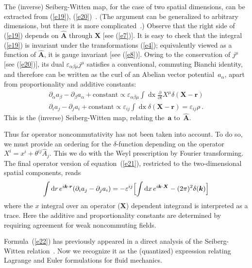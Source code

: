 \documentclass[a4paper,12pt,twoside]{article}
\newcommand{\rd}[1]{\mathop{\mathrm{d}#1}}
\newcommand{\va}{\vec a}
\newcommand{\vA}{\vec A}
\newcommand{\numeq}[2]{\begin{equation}
#2
\label{#1}
\end{equation}}
\newcommand{\refeq}[1]{(\ref{#1})}
\let\vec\boldsymbol
\let\eps\varepsilon
\let\hat\widehat
\begin{document}
The (inverse) Seiberg-Witten map, for the case of two spatial dimensions, can be extracted
from \refeq{e19}, \refeq{e20}~\cite{r3}.  (The argument can be generalized to arbitrary
dimensions, but there it is more complicated~\cite{r3}.) Observe that the right side of
\refeq{e19} depends on
$\hat {\vA}$ through
$\vec X$ [see
\refeq{e7}]. It is easy to check that the integral \refeq{e19} is invariant under the
transformations \refeq{e4}; equivalently viewed as a function of $\hat {\vA}$, it is gauge
invariant   [see \refeq{e8}]. Owing to the conservation of $j^\mu$   [see \refeq{e20}], its dual 
$\eps_{\alpha\beta\mu} j^\mu$ satisfies a conventional, commuting Bianchi identity, and
therefore can be written as the curl of an Abelian vector potential~$a_\alpha$, apart from
proportionality  and additive constants: 
\numeq{e21}{
\begin{gathered}
\partial_\alpha a_\beta - \partial _\beta a_\alpha + \text{constant} 
\propto \eps_{\alpha\beta\mu} \int \rd x \frac\partial{\partial t} X^\mu \delta(\vec X- \vec
r)\\
\partial_i a_j - \partial _j a_i + \text{constant} 
\propto \eps_{ij} \int \rd x   \delta(\vec X- \vec r) = \eps_{ij} \rho\ .
\end{gathered}
 }
This is the (inverse) Seiberg-Witten map, relating the~$\va$ to~$\hat {\vA}$. 

Thus far operator noncommutativity has not been taken into account. To do so, we must
provide an ordering for the $\delta$-function depending on the operator $X^i = x^i + \theta^{ij}
\hat A_j$.  This we do with the Weyl prescription by Fourier transforming. The  final operator
version of equation~\refeq{e21}, restricted to the two-dimensional spatial components, reads
\numeq{e22}{
\int \rd r e^{i\vec k\cdot\vec r} (\partial_i a_j - \partial_j a_i) = 
-\eps^{ij} \Bigl[ \int \rd x  e^{i\vec k\cdot\vec X} - (2\pi)^2\delta(\vec k)   \Bigr] 
}
where the $x$ integral over an operator ($\vec X$) dependent integrand is interpreted as a
trace.  Here the additive and proportionality constants are determined by requiring
agreement for weak noncommuting fields.

Formula~\refeq{e22} has previously appeared  in a direct analysis of the Seiberg-Witten
relation~\cite{r9}. Now we recognize it as the (quantized) expression relating Lagrange and
Euler formulations for fluid mechanics. 

 \newpage 
\def\Journal#1#2#3#4{{\em #1} {\bf #2}, #3 (#4)}
\def\add#1#2#3{{\bf #1}, #2 (#3)}
\def\Book#1#2#3#4{{\em #1}  (#2, #3 #4)}
\def\Bookeds#1#2#3#4#5{{\em #1}, #2  (#3, #4 #5)}
\end{document}

